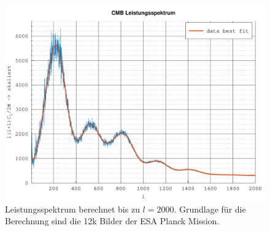 \begin{figure}
	\centering
	\includegraphics[width=\linewidth]{cmb/data/12k2500-500.pdf}
	\caption{Leistungsspektrum berechnet bis zu $l = 2000$. Grundlage für die 
	Berechnung sind die 12k Bilder der ESA Planck Mission.}
	\label{fig:cmb-power-spec-2000}
\end{figure}


